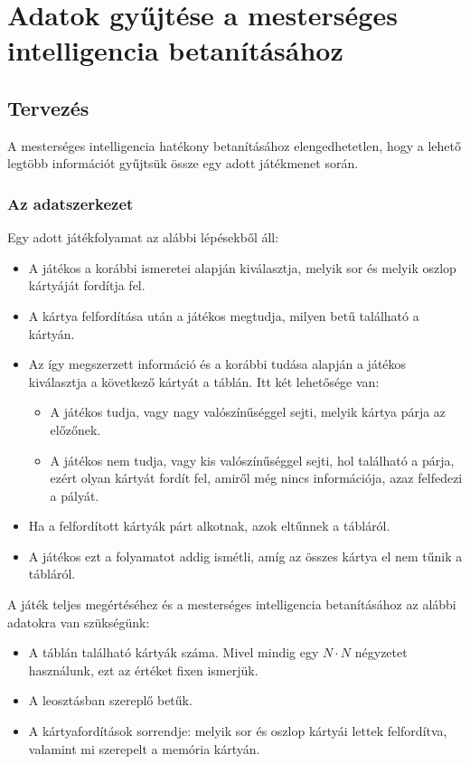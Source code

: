 \chapter{Adatok gyűjtése a mesterséges intelligencia betanításához}
\thispagestyle{fancy}
\pagestyle{fancy}

\section{Tervezés}
A mesterséges intelligencia hatékony betanításához elengedhetetlen, hogy a lehető legtöbb információt gyűjtsük össze egy adott játékmenet során.

\subsection{Az adatszerkezet}
Egy adott játékfolyamat az alábbi lépésekből áll:

\begin{itemize}
\item A játékos a korábbi ismeretei alapján kiválasztja, melyik sor és melyik oszlop kártyáját fordítja fel.
\item A kártya felfordítása után a játékos megtudja, milyen betű található a kártyán.
\item Az így megszerzett információ és a korábbi tudása alapján a játékos kiválasztja a következő kártyát a táblán. Itt két lehetősége van:
\begin{itemize}
\item A játékos tudja, vagy nagy valószínűséggel sejti, melyik kártya párja az előzőnek.
\item A játékos nem tudja, vagy kis valószínűséggel sejti, hol található a párja, ezért olyan kártyát fordít fel, amiről még nincs információja, azaz felfedezi a pályát.
\end{itemize}
\item Ha a felfordított kártyák párt alkotnak, azok eltűnnek a tábláról.
\item A játékos ezt a folyamatot addig ismétli, amíg az összes kártya el nem tűnik a tábláról.
\end{itemize}

A játék teljes megértéséhez és a mesterséges intelligencia betanításához az alábbi adatokra van szükségünk:

\begin{itemize}
\item A táblán található kártyák száma. Mivel mindig egy $N \cdot N$ négyzetet használunk, ezt az értéket fixen ismerjük.
\item A leosztásban szereplő betűk.
\item A kártyafordítások sorrendje: melyik sor és oszlop kártyái lettek felfordítva, valamint mi szerepelt a memória kártyán.
\end{itemize}

